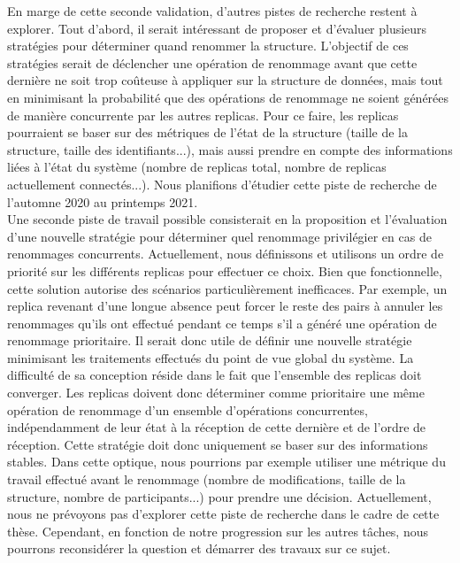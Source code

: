 \documentclass[12pt]{article}
\begin{document}
En marge de cette seconde validation, d'autres pistes de recherche restent à explorer.
Tout d'abord, il serait intéressant de proposer et d'évaluer plusieurs stratégies pour déterminer quand renommer la structure.
L'objectif de ces stratégies serait de déclencher une opération de renommage avant que cette dernière ne soit trop coûteuse à appliquer sur la structure de données, mais tout en minimisant la probabilité que des opérations de renommage ne soient générées de manière concurrente par les autres replicas.
Pour ce faire, les replicas pourraient se baser sur des métriques de l'état de la structure (taille de la structure, taille des identifiants...), mais aussi prendre en compte des informations liées à l'état du système (nombre de replicas total, nombre de replicas actuellement connectés...).
Nous planifions d'étudier cette piste de recherche de l'automne 2020 au printemps 2021.
\\

Une seconde piste de travail possible consisterait en la proposition et l'évaluation d'une nouvelle stratégie pour déterminer quel renommage privilégier en cas de renommages concurrents.
Actuellement, nous définissons et utilisons un ordre de priorité sur les différents replicas pour effectuer ce choix.
Bien que fonctionnelle, cette solution autorise des scénarios particulièrement inefficaces.
Par exemple, un replica revenant d'une longue absence peut forcer le reste des pairs à annuler les renommages qu'ils ont effectué pendant ce temps s'il a généré une opération de renommage prioritaire.
Il serait donc utile de définir une nouvelle stratégie minimisant les traitements effectués du point de vue global du système.
La difficulté de sa conception réside dans le fait que l'ensemble des replicas doit converger.
Les replicas doivent donc déterminer comme prioritaire une même opération de renommage d'un ensemble d'opérations concurrentes, indépendamment de leur état à la réception de cette dernière et de l'ordre de réception.
Cette stratégie doit donc uniquement se baser sur des informations stables.
Dans cette optique, nous pourrions par exemple utiliser une métrique du travail effectué avant le renommage (nombre de modifications, taille de la structure, nombre de participants...) pour prendre une décision.
Actuellement, nous ne prévoyons pas d'explorer cette piste de recherche dans le cadre de cette thèse.
Cependant, en fonction de notre progression sur les autres tâches, nous pourrons reconsidérer la question et démarrer des travaux sur ce sujet.
\\
\end{document}
